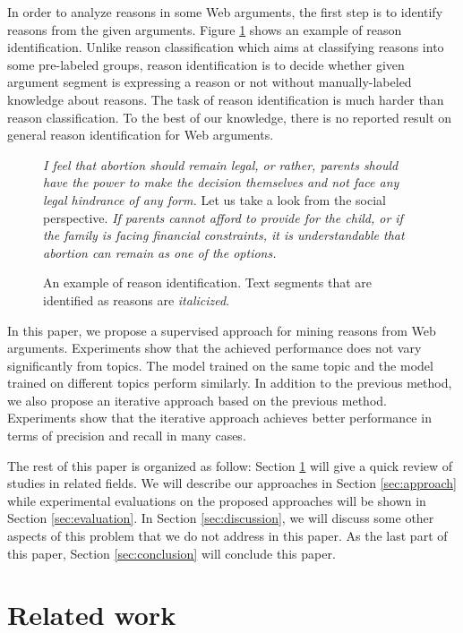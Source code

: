 \documentclass[11pt,a4paper]{article}
\begin{document}
In order to analyze reasons in some Web arguments, the first step is to identify reasons from the given arguments. Figure \ref{figure:reasonidentification} shows an example of reason identification. Unlike reason classification which aims at classifying reasons into some pre-labeled groups\cite{hasan2014you}, reason identification is to decide whether given argument segment is expressing a reason or not without manually-labeled knowledge about reasons. The task of reason identification is much harder than reason classification. To the best of our knowledge, there is no reported result on general reason identification for Web arguments.


\begin{figure}

{\it I feel that abortion should remain legal, or rather, parents should have the power to make the decision themselves and not face any legal hindrance of any form.} Let us take a look from the social perspective. {\it If parents cannot afford to provide for the child, or if the family is facing financial constraints, it is understandable that abortion can remain as one of the options.}


\caption{An example of reason identification. Text segments that are identified as reasons are {\it italicized}.} 
\label{figure:reasonidentification}
\end{figure}

In this paper, we propose a supervised approach for mining reasons from Web arguments. Experiments show that the achieved performance does not vary significantly from topics. The model trained on the same topic and the model trained on different topics perform similarly. In addition to the previous method, we also propose an iterative approach based on the previous method. Experiments show that the iterative approach achieves better performance in terms of precision and recall in many cases. 

The rest of this paper is organized as follow: Section \ref{sec:related} will give a quick review of studies in related fields. We will describe our approaches in Section \ref{sec:approach} while experimental evaluations on the proposed approaches will be shown in Section \ref{sec:evaluation}. In Section \ref{sec:discussion}, we will discuss some other aspects of this problem that we do not address in this paper. As the last part of this paper, Section \ref{sec:conclusion} will conclude this paper.



\section{Related work}
\label{sec:related}
\end{document}
